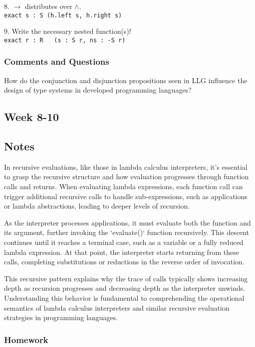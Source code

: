 \documentclass{article}
\theoremstyle{theorem}
\theoremstyle{definition}
\theoremstyle{remark}
\begin{document}
{8. \(\to\) distributes over \(\land\).\\
\texttt{exact \lambda s : S \to (h.left s, h.right s)}

9. Write the necessary nested function(s)!\\
\texttt{exact \lambda r : R \, (\lambda s : S \to r, \lambda ns : -S \to r)}

\subsubsection*{Comments and Questions}

How do the conjunction and disjunction propositions seen in LLG influence the design of type systems in developed programming languages?

\subsection{Week 8-10}


\subsection*{Notes}
In recursive evaluations, like those in lambda calculus interpreters, it’s essential to grasp the recursive structure and how evaluation progresses through function calls and returns. When evaluating lambda expressions, each function call can trigger additional recursive calls to handle sub-expressions, such as applications or lambda abstractions, leading to deeper levels of recursion.

As the interpreter processes applications, it must evaluate both the function and its argument, further invoking the `evaluate()` function recursively. This descent continues until it reaches a terminal case, such as a variable or a fully reduced lambda expression. At that point, the interpreter starts returning from these calls, completing substitutions or reductions in the reverse order of invocation. 

This recursive pattern explains why the trace of calls typically shows increasing depth as recursion progresses and decreasing depth as the interpreter unwinds. Understanding this behavior is fundamental to comprehending the operational semantics of lambda calculus interpreters and similar recursive evaluation strategies in programming languages.
\subsubsection*{Homework}

}
\end{document}
